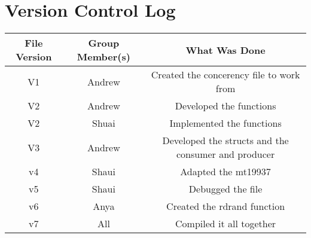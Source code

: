 \section{Version Control Log}
\begin{center}
\begin{tabular}{ |c|c|c| }
   File Version & Group Member(s) & What Was Done \\
   \hline \hline
   V1 & Andrew & Created the concerency file to work from \\
   \hline
   V2 & Andrew & Developed the functions\\
   \hline
   V2 & Shuai & Implemented the functions\\
   \hline
   V3 & Andrew & Developed the structs and the consumer and producer\\
   \hline
   v4 & Shaui & Adapted the mt19937\\
   \hline
   v5 & Shaui & Debugged the file\\
   \hline
   v6 & Anya & Created the rdrand function\\
   \hline
   v7 & All & Compiled it all together\\
   \hline
\end{tabular}
\end{center}

